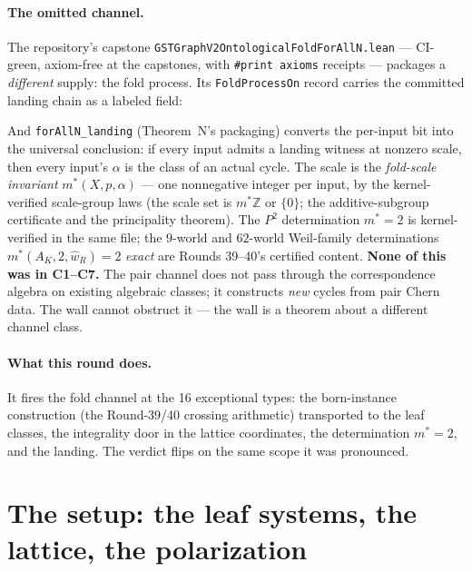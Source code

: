\documentclass[11pt]{article}
\begin{document}
\paragraph{The omitted channel.}  The repository's capstone
\texttt{GSTGraphV2OntologicalFoldForAllN.lean} --- CI-green, axiom-free at the capstones, with
\texttt{\#print axioms} receipts --- packages a \emph{different} supply: the fold process.  Its
\texttt{FoldProcessOn} record carries the committed landing chain as a labeled field:
\begin{center}
\end{center}
And \texttt{forAllN\_landing} (Theorem~N's packaging) converts the per-input bit into the
universal conclusion: if every input admits a landing witness at nonzero scale, then every
input's $\alpha$ is the class of an actual cycle.  The scale is the \emph{fold-scale invariant}
$m^*(X, p, \alpha)$ --- one nonnegative integer per input, by the kernel-verified scale-group
laws (the scale set is $m^*\mathbb{Z}$ or $\{0\}$; the additive-subgroup certificate and the
principality theorem).  The $P^2$ determination $m^* = 2$ is kernel-verified in the same file; the
$9$-world and $62$-world Weil-family determinations $m^*(A_K, 2, \hat w_R) = 2$ \emph{exact} are
Rounds 39--40's certified content.  \textbf{None of this was in C1--C7.}  The pair channel does
not pass through the correspondence algebra on existing algebraic classes; it constructs
\emph{new} cycles from pair Chern data.  The wall cannot obstruct it --- the wall is a theorem
about a different channel class.

\paragraph{What this round does.}  It fires the fold channel at the 16 exceptional types: the
born-instance construction (the Round-39/40 crossing arithmetic) transported to the leaf classes,
the integrality door in the lattice coordinates, the determination $m^* = 2$, and the landing.
The verdict flips on the same scope it was pronounced.

\section{The setup: the leaf systems, the lattice, the polarization}
\end{document}
